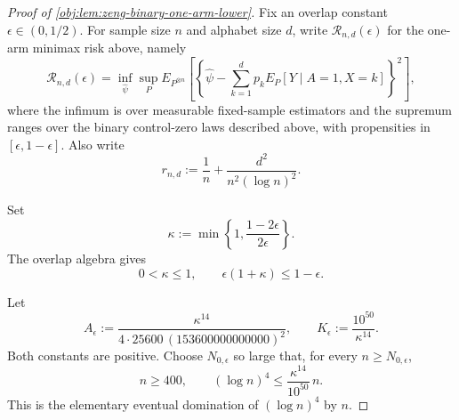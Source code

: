 \documentclass[11pt]{article}
\begin{document}
\begin{proof}[Proof of \cref{obj:lem:zeng-binary-one-arm-lower}]
Fix an overlap constant \(\epsilon\in(0,1/2)\).  For sample size \(n\) and alphabet size \(d\), write \(\mathcal R_{n,d}(\epsilon)\) for the one-arm minimax risk above, namely
\[
\mathcal R_{n,d}(\epsilon)
=
\inf_{\widehat\psi}
\sup_P
E_{P^{\otimes n}}\left[
\left\{\widehat\psi-
\sum_{k=1}^d p_k E_P[Y\mid A=1,X=k]\right\}^2
\right],
\]
where the infimum is over measurable fixed-sample estimators and the supremum ranges over the binary control-zero laws described above, with propensities in \([\epsilon,1-\epsilon]\).  Also write
\[
r_{n,d}:=\frac1n+\frac{d^2}{n^2(\log n)^2}.
\]

Set
\[
\kappa:=\min\left\{1,\frac{1-2\epsilon}{2\epsilon}\right\}.
\]
The overlap algebra gives
\[
0<\kappa\le1,
\qquad
\epsilon(1+\kappa)\le 1-\epsilon .
\]

Let
\[
A_\epsilon:=\frac{\kappa^{14}}{4\cdot25600\,(153600000000000)^2},
\qquad
K_\epsilon:=\frac{10^{50}}{\kappa^{14}}.
\]
Both constants are positive.  Choose \(N_{0,\epsilon}\) so large that, for every \(n\ge N_{0,\epsilon}\),
\[
n\ge 400,
\qquad
(\log n)^4\le \frac{\kappa^{14}}{10^{50}}\,n .
\]
This is the elementary eventual domination of \((\log n)^4\) by \(n\).


\end{proof}
\end{document}
